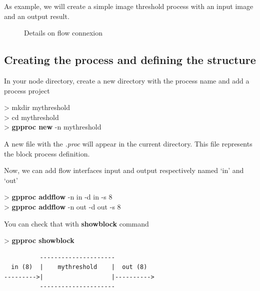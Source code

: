 \documentclass[10pt,a4paper]{article}
\begin{document}
As example, we will create a simple image threshold process with an input image and an output result.

\begin{figure}[h!]
\centering
{}
\caption{Details on flow connexion}
\end{figure}

\subsection{Creating the process and defining the structure}

In your node directory, create a new directory with the process name and add a process project
\begin{sample}
> mkdir mythreshold \\
> cd mythreshold \\
> \textbf{gpproc new} -n mythreshold
\end{sample}

A new file with the \textit{.proc} will appear in the current directory. This file represents the block process definition.

Now, we can add flow interfaces input and output respectively named `in' and `out'
\begin{sample}
> \textbf{gpproc addflow} -n in -d in -s 8 \\
> \textbf{gpproc addflow} -n out -d out -s 8
\end{sample}

You can check that with \textbf{showblock} command
\begin{sample}
> \textbf{gpproc showblock}
\begin{verbatim}
          ---------------------           
  in (8)  |    mythreshold    |  out (8)  
--------->|                   |---------->
          ---------------------
\end{verbatim}
\end{sample}
\end{document}
